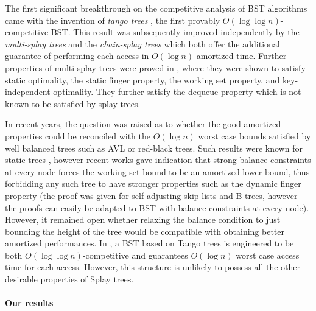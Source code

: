 \documentclass[11pt]{article}
\begin{document}
The first significant breakthrough on the competitive analysis of BST
algorithms came with the invention of \emph{tango trees} \cite{tangotrees}, the first
provably $O(\log\log n)$-competitive BST. This result was subsequently
improved independently by the \emph{multi-splay trees}
\cite{multisplay} and the \emph{chain-splay trees} \cite{chain-splay} which both offer
the additional guarantee of performing each access in $O(\log n)$
amortized time. Further properties of multi-splay trees were proved in
\cite{multisplayprop}, where they were shown to satisfy static
optimality, the static finger property, the working set property, and
key-independent optimality. They further satisfy the dequeue property
which is not known to be satisfied by splay trees.

In recent years, the question was raised as to whether the good
amortized properties could be reconciled with the $O(\log n)$ worst
case bounds satisfied by well balanced trees such as AVL or red-black
trees.
Such results were known for static trees \cite{balancestatic}, however
recent works gave indication that strong balance constraints at every
node forces the working set bound to be an amortized lower bound, thus forbidding
any such tree to have stronger properties such as the dynamic finger property
\cite{skiplists_SODA08} (the proof was given for self-adjusting
skip-lists and B-trees, however the proofs can easily be adapted to
BST with balance constraints at every node). However, it remained open
whether relaxing the balance condition to just bounding the height of
the tree would be compatible with obtaining better amortized performances.
In \cite{competworstcase}, a BST based on Tango trees \cite{tangotrees} is engineered to be both
$O(\log\log n)$-competitive and guarantees $O(\log n)$ worst case
access time for each access. However, this structure is unlikely to
possess all the other desirable properties of Splay trees.

\paragraph{Our results}
\end{document}
